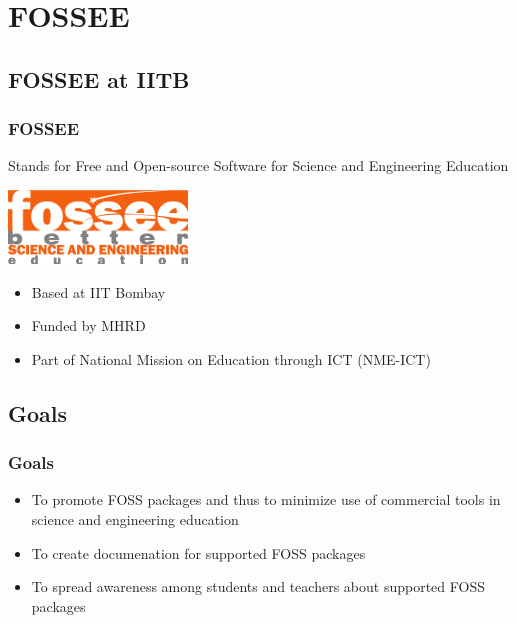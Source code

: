 \documentclass[compress,red]{beamer} %
\begin{document}
\section{FOSSEE}

\subsection{FOSSEE at IITB}
\begin{frame}
\frametitle{FOSSEE}
\begin{block}{Stands for}
Free and Open-source Software for Science and Engineering
Education \pause
\end{block}
\begin{center}
\vspace*{0.25cm}
\includegraphics[scale=2]{fossee.png} \pause
\end{center}
\vspace*{0.25cm}
\begin{itemize}
\item Based at IIT Bombay \pause
\item Funded by MHRD \pause
\item Part of National Mission on Education through ICT (NME-ICT) 
\end{itemize}
\end{frame}

\subsection{Goals}
\begin{frame}
\frametitle{Goals}
\begin{itemize}
\item To promote \alert{FOSS} packages and thus to minimize use of commercial tools in science and engineering education \pause
\item To create documenation for supported \alert{FOSS} packages \pause
\item To spread awareness among students and teachers about supported \alert{FOSS} packages   
\end{itemize}
\end{frame}
\end{document}
